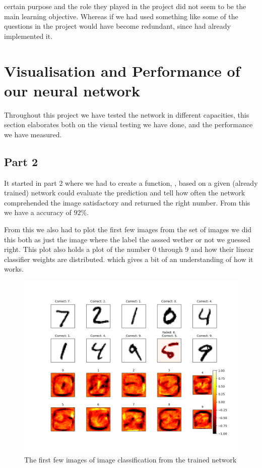 \documentclass[a4paper,oneside,article,english]{memoir}
\begin{document}
certain purpose and the role they played in the project did not seem to be the
main learning objective. Whereas if we had used something like
\href{https://numpy.org}{\underline{}} some
of the questions in the project would have become redundant, since
 had already implemented it.


\section{Visualisation and Performance of our neural network}  
\label{ch:visualisation}
Throughout this project we have tested the network in different capacities, this
section elaborates both on the visual testing we have done, and the performance
we have measured.
\subsection{Part 2}
It started in part 2 where we had to create a function, , based on a given (already trained) network could evaluate the prediction and tell how often the network comprehended the image satisfactory and returned the right number. From this we have a accuracy of $92\%$. 

From this we also had to plot the first few images from the set of images we did this both as just the image where the label the asssed wether or not we guessed right. This plot also holds a plot of the number 0 through 9 and how their linear classifier weights are distributed. which gives a bit of an understanding of how it works.

\begin{figure}[H]
    \centering
    \includegraphics[scale = 0.5]{plot_image_eval.png}
    \caption{The first few images of image classification from the trained network}
    \label{fig:evaluation}
\end{figure}
\end{document}
